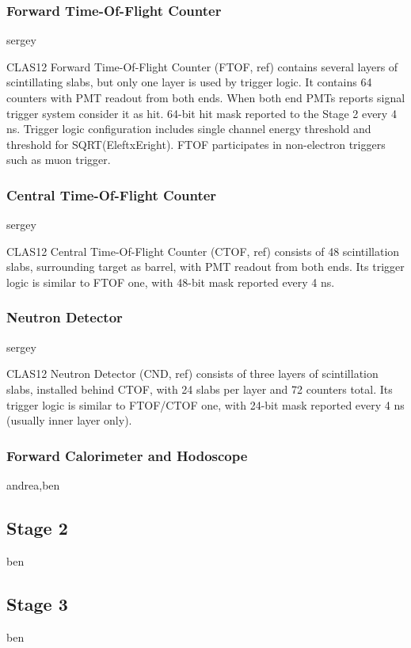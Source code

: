 \subsubsection{Forward Time-Of-Flight Counter} sergey

CLAS12 Forward Time-Of-Flight Counter (FTOF, ref) contains several layers of scintillating slabs, but only one layer is used by trigger logic. It contains 64 counters with PMT readout from both ends. When both end PMTs reports signal trigger system consider it as hit. 64-bit hit mask reported to the Stage 2 every 4 ns. Trigger logic configuration includes single channel energy threshold and threshold for SQRT(EleftxEright). FTOF participates in non-electron triggers such as muon trigger.


\subsubsection{Central Time-Of-Flight Counter} sergey

CLAS12 Central Time-Of-Flight Counter (CTOF, ref) consists of 48 scintillation slabs, surrounding target as barrel, with PMT readout from both ends. Its trigger logic is similar to FTOF one, with 48-bit mask reported every 4 ns.


\subsubsection{Neutron Detector} sergey

CLAS12 Neutron Detector (CND, ref) consists of three layers of scintillation slabs, installed behind CTOF, with 24 slabs per layer and 72 counters total. Its trigger logic is similar to FTOF/CTOF one, with 24-bit mask reported every 4 ns (usually inner layer only).


\subsubsection{Forward Calorimeter and Hodoscope} andrea,ben


\subsection{Stage 2} ben


\subsection{Stage 3} ben

